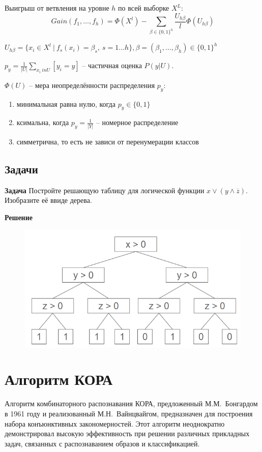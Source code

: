 Выигрыш от ветвления на уровне $h$ по всей выборке $X^L$:
$$Gain(f_1, \dots, f_h) = \Phi(X^l) - \sum_{\beta\in \{0, 1\}^h} \frac{U_{h\beta}}{l}\Phi(U_{h\beta})$$

$U_{h\beta} = \{ x_i \in X^l \ | \ f_s(x_i)=\beta_s,\ s=1\dots h \}, \beta=(\beta_1, \dots, \beta_h) \in \{0, 1\}^h$

$p_y =\frac{1}{|U|} \sum_{x_i \ in U}[y_i = y]$ -- частичная оценка $P(y|U)$.

$\Phi(U)$ -- мера неопределённости распределения $p_y$:
\begin{enumerate}
    \item минимальная  равна нулю, когда $p_y \in \{0,1\}$
    \item ксимальна, когда $p_y = \frac{1}{|Y|}$ -- номерное распределение
    \item симметрична, то есть не зависи от перенумерации классов
\end{enumerate}

\subsection{Задачи}

\textbf{Задача}
Постройте решающую таблицу для логической функции $x \vee (y \wedge \overline{z}).$ Изобразите её ввиде дерева.

\textbf{Решение}
\begin{figure}
    \centering
    \includegraphics[width=0.5\linewidth]{chapters/logical/images/decide_table_task_sol.png}
\end{figure}

\section{Алгоритм КОРА}

Алгоритм комбинаторного распознавания КОРА, предложенный М.М.~Бонгардом в 1961 году и реализованный М.Н.~Вайнцвайгом, предназначен для построения набора конъюнктивных закономерностей. Этот алгоритм неоднократно демонстрировал высокую эффективность при решении различных прикладных задач, связанных с распознаванием образов и классификацией.

